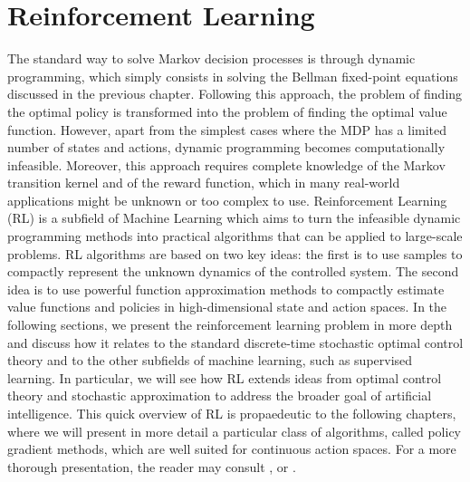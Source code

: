 \chapter{Reinforcement Learning}
\label{ch:reinforcement_learning}

The standard way to solve Markov decision processes is through dynamic programming, which simply consists in solving the Bellman fixed-point equations discussed in the previous chapter. Following this approach, the problem of finding the optimal policy is transformed into the problem of finding the optimal value function. However, apart from the simplest cases where the MDP has a limited number of states and actions, dynamic programming becomes computationally infeasible. Moreover, this approach requires complete knowledge of the Markov transition kernel and of the reward function, which in many real-world applications might be unknown or too complex to use. Reinforcement Learning (RL) is a subfield of Machine Learning which aims to turn the infeasible dynamic programming methods into practical algorithms that can be applied to large-scale problems. RL algorithms are based on two key ideas: the first is to use samples to compactly represent the unknown dynamics of the controlled system. The second idea is to use powerful function approximation methods to compactly estimate value functions and policies in high-dimensional state and action spaces. In the following sections, we present the reinforcement learning problem in more depth and discuss how it relates to the standard discrete-time stochastic optimal control theory and to the other subfields of machine learning, such as supervised learning. In particular, we will see how RL extends ideas from optimal control theory and stochastic approximation to address the broader goal of artificial intelligence. This quick overview of RL is propaedeutic to the following chapters, where we will present in more detail a particular class of algorithms, called policy gradient methods, which are well suited for continuous action spaces. For a more thorough presentation, the reader may consult \cite{sutton1998introduction}, \cite{szepesvari2010algorithms} or \cite{wiering2012reinforcement}.

